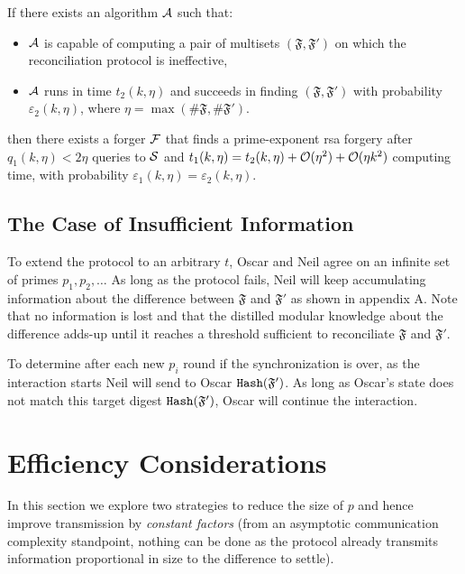 \documentclass[11pt]{llncs}
\begin{document}
\begin{theorem}\label{b}
If there exists an algorithm $\cal A$ such that:
\begin{itemize}
\item $\cal A$ is capable of computing a pair of multisets $(\mathfrak{F},\mathfrak{F}')$ on which the reconciliation protocol is ineffective,
\item $\cal A$ runs in time $t_2(k,\eta)$ and succeeds in finding $(\mathfrak{F},\mathfrak{F}')$ with probability $\varepsilon_2(k,\eta)$, where $\eta=\max(\#\mathfrak{F},\#\mathfrak{F}')$.
\end{itemize}
then there exists a forger $\cal F$ that finds a prime-exponent {\sc rsa} forgery after $q_1(k,\eta)<2\eta$ queries to $\cal S$ and $t_1(k,\eta)=t_2(k,\eta)+{\cal O}(\eta^2)+ {\cal O}(\eta k^2)$ computing time, with probability $\varepsilon_1(k,\eta)=\varepsilon_2(k,\eta)$.\smallskip
\end{theorem}

\subsection{The Case of Insufficient Information}
\label{insuf}
To extend the protocol to an arbitrary $t$, Oscar and Neil agree on an infinite set of primes $p_1,p_2,\ldots$ As long as the protocol fails, Neil will keep accumulating information about the difference between $\mathfrak{F}$ and $\mathfrak{F}'$ as shown in appendix A. Note that no information is lost and that the distilled modular knowledge about the difference adds-up until it reaches a threshold sufficient to reconciliate $\mathfrak{F}$ and $\mathfrak{F}'$.\smallskip

To determine after each new $p_i$ round if the synchronization is over, as the interaction starts Neil will send to Oscar $\mbox{{\tt Hash}}(\mathfrak{F}')$. As long as Oscar's state does not match this target digest $\mbox{{\tt Hash}}(\mathfrak{F}')$, Oscar will continue the interaction.

\section{Efficiency Considerations}

In this section we explore two strategies to reduce the size of $p$ and hence improve transmission by {\sl constant factors} (from an asymptotic communication complexity standpoint, nothing can be done as the protocol already transmits information proportional in size to the difference to settle).
\end{document}
